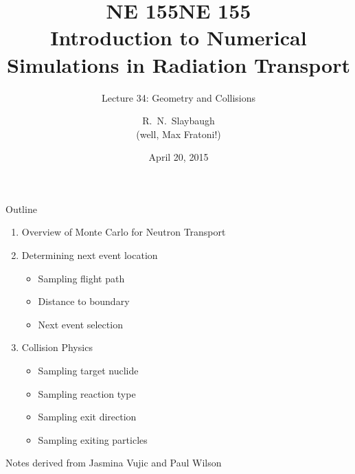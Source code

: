\documentclass[xcolor=x11names,compress]{beamer}
\title{NE 155}
\author{R.\ N.\ Slaybaugh \\
(well, Max Fratoni!)}
\date{April 20, 2015}
\renewcommand{\(}{\begin{columns}}
\renewcommand{\)}{\end{columns}}
\newcommand{\<}[1]{\begin{column}{#1}}
\renewcommand{\>}{\end{column}}
\begin{document}
\begin{frame}
\title{NE 155\\Introduction to Numerical Simulations in Radiation Transport}
\subtitle{Lecture 34: Geometry and Collisions}
\titlepage
\end{frame}


\begin{frame}{Outline}

    \begin{enumerate}
    \item Overview of Monte Carlo for Neutron Transport
    \item Determining next event location
      \begin{itemize}
      \item Sampling flight path
      \item Distance to boundary %
      \item Next event selection
      \end{itemize}
    \item Collision Physics
      \begin{itemize}
      \item Sampling target nuclide
      \item Sampling reaction type
      \item Sampling exit direction
      \item Sampling exiting particles
      \end{itemize}
    \end{enumerate}

\vspace*{1em}
Notes derived from Jasmina Vujic and Paul Wilson
\end{frame}
\end{document}
